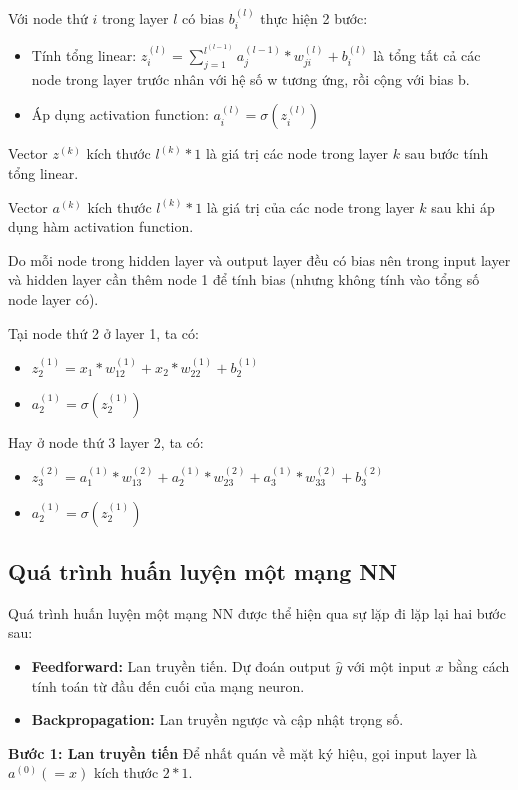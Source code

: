 Với node thứ $i$ trong layer $l$ có bias $b_i^{(l)}$ thực hiện 2 bước:
\begin{itemize}
\item Tính tổng linear: $z_i^{(l)} = \sum_{j=1}^{l^{(l-1)}} a_j^{(l-1)} * w_{ji}^{(l)} + b_i^{(l)}$ là tổng tất cả các node trong layer trước nhân với hệ số w tương ứng, rồi cộng với bias b.
\item Áp dụng activation function: $a_i^{(l)} = \sigma(z_i^{(l)})$
\end{itemize}

Vector $z^{(k)}$ kích thước $l^{(k)} * 1$ là giá trị các node trong layer $k$ sau bước tính tổng linear.

Vector $a^{(k)}$ kích thước $l^{(k)} * 1$ là giá trị của các node trong layer $k$ sau khi áp dụng hàm activation function.



Do mỗi node trong hidden layer và output layer đều có bias nên trong input layer và hidden layer cần thêm node 1 để tính bias (nhưng không tính vào tổng số node layer có).

Tại node thứ 2 ở layer 1, ta có:

\begin{itemize}
\item $z_2^{(1)} =  x_1 * w_{12}^{(1)} +  x_2 * w_{22}^{(1)} + b_2^{(1)}$
\item $a_2^{(1)} = \sigma(z_2^{(1)})$
\end{itemize} 

Hay ở node thứ 3 layer 2, ta có:
\begin{itemize}
\item $z_3^{(2)} =  a_1^{(1)} * w_{13}^{(2)} + a_2^{(1)} * w_{23}^{(2)}  + a_3^{(1)} * w_{33}^{(2)} + b_3^{(2)}$
\item $a_2^{(1)} = \sigma(z_2^{(1)})$
\end{itemize} 

\subsection{Quá trình huấn luyện một mạng NN}

Quá trình huấn luyện một mạng NN được thể hiện qua sự lặp đi lặp lại hai bước sau:
\begin{itemize}
\item \textbf{Feedforward:} Lan truyền tiến. Dự đoán output $\hat{y}$ với một input $x$ bằng cách tính toán từ đầu đến cuối của mạng neuron.
\item \textbf{Backpropagation:} Lan truyền ngược và cập nhật trọng số.
\end{itemize}
\textbf{Bước 1: Lan truyền tiến}
Để nhất quán về mặt ký hiệu, gọi input layer là $a^{(0)} (=x)$ kích thước $2*1$.


